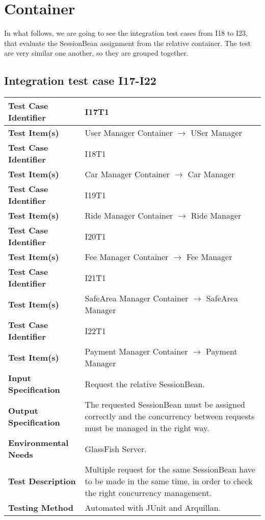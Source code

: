 \section{Container}

In what follows, we are going to see the integration test cases from I18 to I23, that evaluate the SessionBean assignment from the relative container. The test are very similar one another, so they are grouped together.

\subsection{Integration test case I17-I22}

\begin{tabular}{l p{}}
    \hline
    \textbf{Test Case Identifier} & I17T1\\
    \hline
    \textbf{Test Item(s)} & User Manager Container $\rightarrow$ USer Manager \\
    \hline
    \hline
    \textbf{Test Case Identifier} & I18T1\\
    \hline
    \textbf{Test Item(s)} & Car Manager Container $\rightarrow$ Car Manager \\
    \hline
    \hline
    \textbf{Test Case Identifier} & I19T1\\
    \hline
    \textbf{Test Item(s)} & Ride Manager Container $\rightarrow$ Ride Manager \\
    \hline
    \hline
    \textbf{Test Case Identifier} & I20T1\\
    \hline
    \textbf{Test Item(s)} & Fee Manager Container $\rightarrow$ Fee Manager \\
    \hline
    \hline
    \textbf{Test Case Identifier} & I21T1\\
    \hline
    \textbf{Test Item(s)} & SafeArea Manager Container $\rightarrow$ SafeArea Manager \\
    \hline
    \hline
    \textbf{Test Case Identifier} & I22T1\\
    \hline
    \textbf{Test Item(s)} & Payment Manager Container $\rightarrow$ Payment Manager \\
    \hline
    \hline
    \textbf{Input Specification} & Request the relative SessionBean. \\
    \hline
    \textbf{Output Specification} & The requested SessionBean must be assigned correctly and the concurrency between requests must be managed in the right way. \\
    \hline
    \textbf{Environmental Needs} & GlassFish Server.\\
    \hline
    \textbf{Test Description} & Multiple request for the same SessionBean have to be made in the same time, in order to check the right concurrency management.\\
    \hline
    \textbf{Testing Method} & Automated with JUnit and Arquillan. \\
    \hline
\end{tabular}